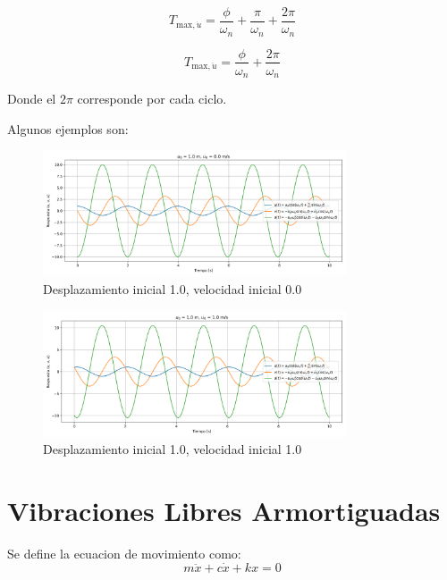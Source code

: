\documentclass{article}  %
\begin{document}
\begin{equation}
    T_{\text{max},\dot{u}} = \frac{\phi}{\omega_n} + \frac{\pi}{\omega_n} + \frac{2\pi}{\omega_n}
\end{equation}

\begin{equation}
    T_{\text{max},\ddot{u}} = \frac{\phi}{\omega_n} + \frac{2\pi}{\omega_n}
\end{equation}

Donde el $2\pi$ corresponde por cada ciclo.

Algunos ejemplos son:

\begin{figure}[H]
    \centering
    \includegraphics[width=0.8\textwidth]{GRAFICOS/sis_no_amortiguado_u0_1.0_v0_0.0.png}
    \caption{Desplazamiento inicial 1.0, velocidad inicial 0.0}
    \label{fig:ejemplo1}
\end{figure}

\begin{figure}[H]
    \centering
    \includegraphics[width=0.8\textwidth]{GRAFICOS/sis_no_amortiguado_u0_1.0_v0_1.0.png}
    \caption{Desplazamiento inicial 1.0, velocidad inicial 1.0}
    \label{fig:ejemplo1}
\end{figure}


\section{Vibraciones Libres Armortiguadas}

Se define la ecuacion de movimiento como:
\begin{equation}
    m \ddot{x} + c \dot{x} + kx = 0
\end{equation}
\end{document}
